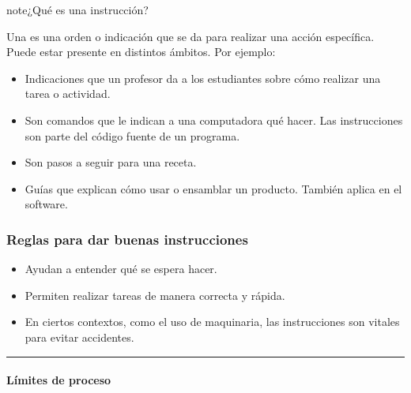 \documentclass[letterpaper,10pt,spanish]{sphinxmanual}
\begin{document}
\begin{sphinxadmonition}{note}{¿Qué es una instrucción?}

\sphinxAtStartPar
Una  es una orden o indicación que se da para realizar una acción específica. Puede estar presente en distintos ámbitos. Por ejemplo:
\begin{itemize}
\item {} 
\sphinxAtStartPar
{} Indicaciones que un profesor da a los estudiantes sobre cómo realizar una tarea o actividad.

\item {} 
\sphinxAtStartPar
{} Son comandos que le indican a una computadora qué hacer. Las instrucciones son parte del código fuente de un programa.

\item {} 
\sphinxAtStartPar
{} Son pasos a seguir para una receta.

\item {} 
\sphinxAtStartPar
{} Guías que explican cómo usar o ensamblar un producto. También aplica en el software.

\end{itemize}
\subsubsection*{Reglas para dar buenas instrucciones}
\begin{itemize}
\item {} 
\sphinxAtStartPar
{} Ayudan a entender qué se espera hacer.

\item {} 
\sphinxAtStartPar
{} Permiten realizar tareas de manera correcta y rápida.

\item {} 
\sphinxAtStartPar
{} En ciertos contextos, como el uso de maquinaria, las instrucciones son vitales para evitar accidentes.

\end{itemize}
\end{sphinxadmonition}


\bigskip\hrule\bigskip



\paragraph{Límites de proceso}
\label{\detokenize{cursos/ofimatica11/recursos/T02:limites-de-proceso}}
\end{document}

